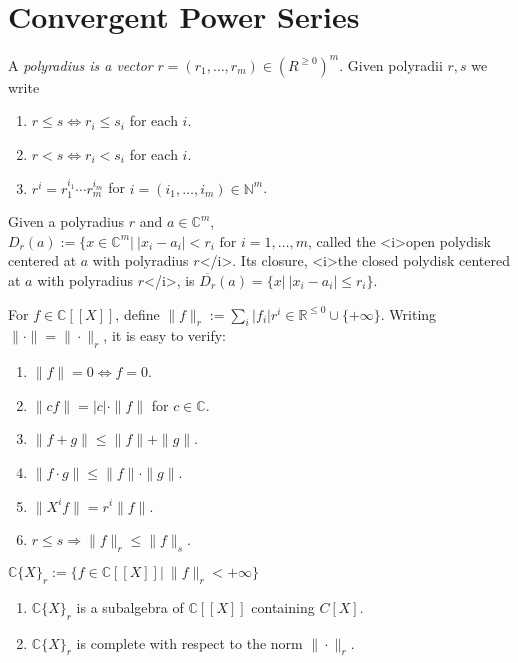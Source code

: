\section{Convergent Power Series }

A {\em polyradius is a vector} $r = (r_1,\ldots, r_m)\in (R^{\geq 0})^m$.
Given polyradii $r,s$ we write
\begin{enumerate}
  \item  $r\leq s \Leftrightarrow r_i \leq s_i$ for each $i$.
  \item  $r < s \Leftrightarrow r_i < s_i$ for each $i$.
  \item  $r^i = r_1^{i_1}\cdots r_m^{i_m}$ for $i = (i_1,\ldots, i_m)\in \mathbb{N}^m$.
\end{enumerate}

Given a polyradius $r$ and $a\in \mathbb{C}^m$, $D_r(a):= \{x\in \mathbb{C}^m |\ |x_i - a_i| < r_i
\textrm{ for } i = 1,\ldots,m$, called the <i>open polydisk centered at $a$ with polyradius $r$</i>.
Its closure, <i>the closed polydisk centered at $a$ with polyradius $r$</i>, is $\overline{D_r}(a) = \{x | \ |x_i - a_i| \leq r_i\}$.

For $f\in \mathbb{C}[[X]]$, define $\|f\|_r := \sum_i |f_i| r^i \in \mathbb{R}^{\leq 0} \cup \{+\infty\}$.
Writing $\|\cdot \| = \|\cdot \|_r$, it is easy to verify:
\begin{enumerate}
  \item  $\|f\| = 0 \Leftrightarrow f = 0$.
  \item  $\|c f\| = |c| \cdot \|f\|$ for $c\in \mathbb{C}$.
  \item  $\|f + g\| \leq \|f\| + \|g\|$.
  \item  $\|f\cdot g\| \leq \|f\| \cdot \|g\|$.
  \item  $\|X^i f\| = r^i \|f\|$.
  \item  $r\leq s \Rightarrow \|f\|_r \leq \|f\|_s$.
\end{enumerate}

\begin{definition} %
$\mathbb{C}\{X\}_r := \{f\in \mathbb{C}[[X]] |\ \|f\|_r < +\infty \}$
 \end{definition}

\begin{lemma} %
\begin{enumerate}
  \item  $\mathbb{C} \{X\}_r$ is a subalgebra of $\mathbb{C}[[X]]$ containing $C[X]$.
  \item  $\mathbb{C} \{X\}_r$ is complete with respect to the norm $\|\cdot\|_r$.
\end{enumerate}
 \end{lemma}

